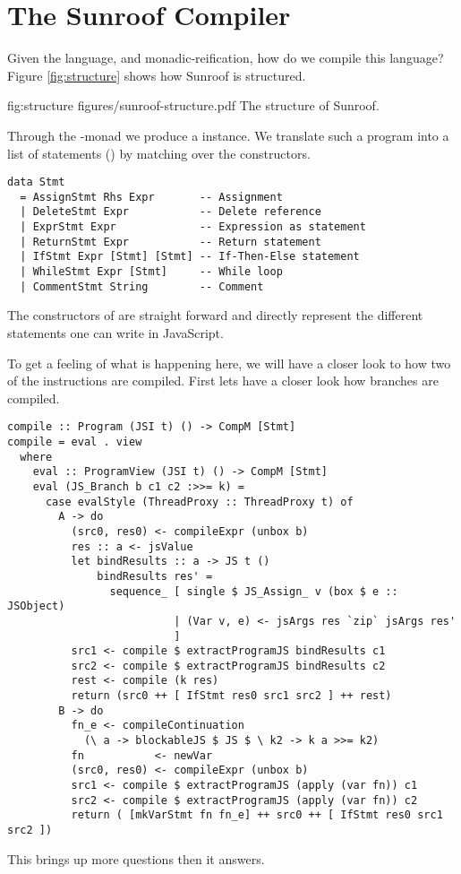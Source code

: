  
\section{The Sunroof Compiler}
\label{sec:compiler}

Given the language, and monadic-reification, how do we compile this language?
Figure \ref{fig:structure} shows how Sunroof is structured.

\Figure%
{fig:structure}%
{figures/sunroof-structure.pdf}%
{The structure of Sunroof.}

Through the \JS-monad we produce a  instance. We 
translate such a program into a list of statements () by matching over 
the \JSI constructors.
\begin{verbatim}
data Stmt 
  = AssignStmt Rhs Expr       -- Assignment
  | DeleteStmt Expr           -- Delete reference
  | ExprStmt Expr             -- Expression as statement
  | ReturnStmt Expr           -- Return statement
  | IfStmt Expr [Stmt] [Stmt] -- If-Then-Else statement
  | WhileStmt Expr [Stmt]     -- While loop
  | CommentStmt String        -- Comment
\end{verbatim}
The constructors of  are straight forward and
directly represent the different statements one can write
in JavaScript.

To get a feeling of what is happening here, we will have a closer
look to how two of the \JSI instructions are compiled. First
lets have a closer look how branches are compiled.
\begin{verbatim}
compile :: Program (JSI t) () -> CompM [Stmt]
compile = eval . view
  where
    eval :: ProgramView (JSI t) () -> CompM [Stmt]
    eval (JS_Branch b c1 c2 :>>= k) = 
      case evalStyle (ThreadProxy :: ThreadProxy t) of
        A -> do
          (src0, res0) <- compileExpr (unbox b)
          res :: a <- jsValue
          let bindResults :: a -> JS t ()
              bindResults res' =
                sequence_ [ single $ JS_Assign_ v (box $ e :: JSObject)
                          | (Var v, e) <- jsArgs res `zip` jsArgs res'
                          ]
          src1 <- compile $ extractProgramJS bindResults c1
          src2 <- compile $ extractProgramJS bindResults c2
          rest <- compile (k res)
          return (src0 ++ [ IfStmt res0 src1 src2 ] ++ rest)
        B -> do
          fn_e <- compileContinuation 
            (\ a -> blockableJS $ JS $ \ k2 -> k a >>= k2)
          fn           <- newVar
          (src0, res0) <- compileExpr (unbox b)
          src1 <- compile $ extractProgramJS (apply (var fn)) c1
          src2 <- compile $ extractProgramJS (apply (var fn)) c2
          return ( [mkVarStmt fn fn_e] ++ src0 ++ [ IfStmt res0 src1 src2 ])
\end{verbatim}
\TODO This brings up more questions then it answers.


